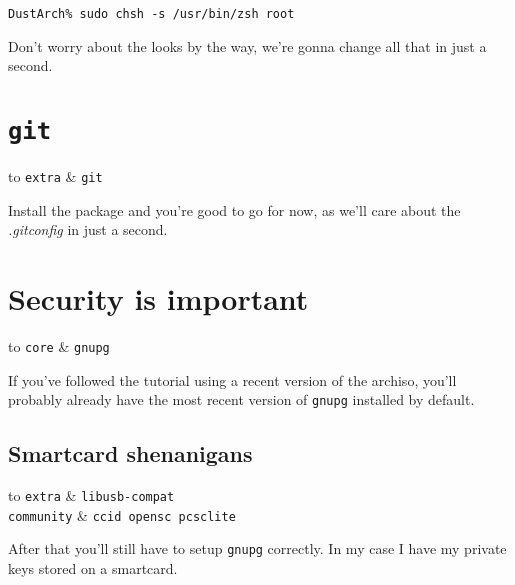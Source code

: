 \documentclass[9pt]{report}
\newenvironment{packagetable}
{\begin{longtabu}to \textwidth [b]{X[1,r]|X[1,l]}}
{\end{longtabu}}
\begin{document}
\begin{verbatim}
DustArch% sudo chsh -s /usr/bin/zsh root
\end{verbatim}

Don’t worry about the looks by the way, we’re gonna change all that in just a second.



\newpage

\hypertarget{x-git}{\section{\texttt{git}}}
\begin{packagetable}
    \texttt{extra} & \texttt{git} \\ 
\end{packagetable}

Install the package and you’re good to go for now, as we’ll care about the \textit{.gitconfig} in just a second.



\newpage

\hypertarget{x-security-is-important}{\section{Security is important}}
\begin{packagetable}
    \texttt{core} & \texttt{gnupg} \\ 
\end{packagetable}

If you’ve followed the tutorial using a recent version of the archiso, you’ll probably already have the most recent version of \texttt{gnupg} installed by default.



\newpage

\hypertarget{x-smartcard-shenanigans}{\subsection{Smartcard shenanigans}}
\begin{packagetable}
    \texttt{extra} & \texttt{libusb-compat} \\ 
    \texttt{community} & \texttt{ccid opensc pcsclite} \\ 
\end{packagetable}

After that you’ll still have to setup \texttt{gnupg} correctly.
In my case I have my private keys stored on a smartcard.
\end{document}
